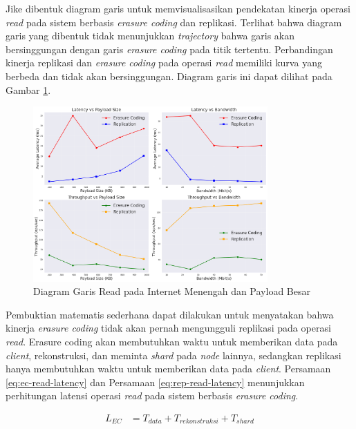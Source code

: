 \begin{enumerate}
  Jike dibentuk diagram garis untuk memvisualisasikan pendekatan kinerja operasi \textit{read} pada sistem berbasis \textit{erasure coding} dan replikasi. Terlihat bahwa diagram garis yang dibentuk tidak menunjukkan \textit{trajectory} bahwa garis akan bersinggungan dengan garis \textit{erasure coding} pada titik tertentu. Perbandingan kinerja replikasi dan \textit{erasure coding} pada operasi \textit{read} memiliki kurva yang berbeda dan tidak akan bersinggungan. Diagram garis ini dapat dilihat pada Gambar \ref{fig:read-bigload-avgnet-line}.

  \begin{figure}[ht]
    \centering
    \includegraphics[width=0.8\textwidth]{resources/chapter-4/read_bigload_avgnet_line.png}

    \caption{Diagram Garis Read pada Internet Menengah dan Payload Besar}
    \label{fig:read-bigload-avgnet-line}
  \end{figure}

  Pembuktian matematis sederhana dapat dilakukan untuk menyatakan bahwa kinerja \textit{erasure coding} tidak akan pernah mengungguli replikasi pada operasi \textit{read}. Erasure coding akan membutuhkan waktu untuk memberikan data pada \textit{client}, rekonstruksi, dan meminta \textit{shard} pada \textit{node} lainnya, sedangkan replikasi hanya membutuhkan waktu untuk memberikan data pada \textit{client}. Persamaan \ref{eq:ec-read-latency} dan Persamaan \ref{eq:rep-read-latency} menunjukkan perhitungan latensi operasi \textit{read} pada sistem berbasis \textit{erasure coding}.

  \begin{align}
  L_{EC} &= T_{data} + T_{rekonstruksi} + T_{shard}
  \label{eq:ec-read-latency}
  \end{align}


\end{enumerate}
